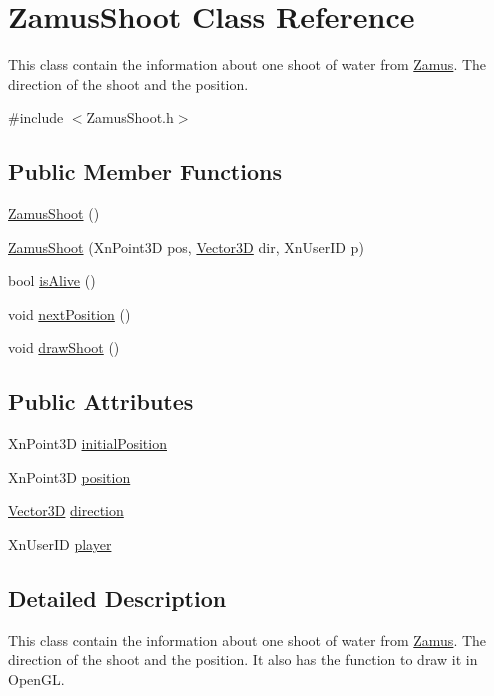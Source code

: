 \hypertarget{classZamusShoot}{
\section{ZamusShoot Class Reference}
\label{classZamusShoot}
}


This class contain the information about one shoot of water from \hyperlink{classZamus}{Zamus}. The direction of the shoot and the position.  




{\ttfamily \#include $<$ZamusShoot.h$>$}

\subsection*{Public Member Functions}
\begin{DoxyCompactItemize}
\item 
\hyperlink{classZamusShoot_afa64b29375e211b297ef9df3b62df407}{ZamusShoot} ()
\item 
\hyperlink{classZamusShoot_a095a021221dda360f8d907a10c93d8f4}{ZamusShoot} (XnPoint3D pos, \hyperlink{classVector3D}{Vector3D} dir, XnUserID p)
\item 
bool \hyperlink{classZamusShoot_a2cf4ee36add75a60a667d04f59b1fd03}{isAlive} ()
\item 
void \hyperlink{classZamusShoot_a59597b88cd171964a8f240da485e69c4}{nextPosition} ()
\item 
void \hyperlink{classZamusShoot_a45f1492b67c2d5aa7b370db5a964152b}{drawShoot} ()
\end{DoxyCompactItemize}
\subsection*{Public Attributes}
\begin{DoxyCompactItemize}
\item 
XnPoint3D \hyperlink{classZamusShoot_a4ea6fd218d7bf2371e53b944042ec7cc}{initialPosition}
\item 
XnPoint3D \hyperlink{classZamusShoot_a1705d9588502985250c1732ee1215c41}{position}
\item 
\hyperlink{classVector3D}{Vector3D} \hyperlink{classZamusShoot_a77f14fc25129a676ec070a77220c6174}{direction}
\item 
XnUserID \hyperlink{classZamusShoot_a38bfd1383bd11ee5d68d22de84904a9f}{player}
\end{DoxyCompactItemize}


\subsection{Detailed Description}
This class contain the information about one shoot of water from \hyperlink{classZamus}{Zamus}. The direction of the shoot and the position. It also has the function to draw it in OpenGL. 

